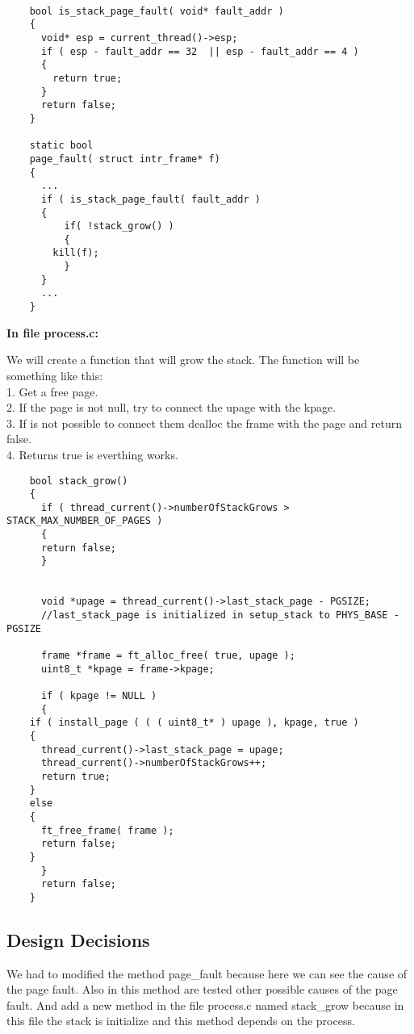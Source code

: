\begin{lstlisting}

	bool is_stack_page_fault( void* fault_addr )
	{
	  void* esp = current_thread()->esp;
	  if ( esp - fault_addr == 32  || esp - fault_addr == 4 )
	  {
	    return true;
	  }
	  return false;
	}

	static bool
	page_fault( struct intr_frame* f)
	{
	  ...
	  if ( is_stack_page_fault( fault_addr )
	  {
	      if( !stack_grow() )
	      {
		kill(f);
	      }
	  }
	  ...
	}

\end{lstlisting}


\textbf{In file process.c: }

We will create a function that will grow the stack. The function will be something like this:
      \\1. Get a free page. 
      \\2. If the page is not null, try to connect the  upage with the kpage.
      \\3. If is not possible to connect them dealloc the frame with the page and return false.
      \\4. Returns true is everthing works.

\begin{lstlisting}
    bool stack_grow()
    {
      if ( thread_current()->numberOfStackGrows > STACK_MAX_NUMBER_OF_PAGES )
      {
	  return false;
      }

      
      void *upage = thread_current()->last_stack_page - PGSIZE; 
      //last_stack_page is initialized in setup_stack to PHYS_BASE - PGSIZE

      frame *frame = ft_alloc_free( true, upage );
      uint8_t *kpage = frame->kpage;
 
      if ( kpage != NULL )
      {
	if ( install_page ( ( ( uint8_t* ) upage ), kpage, true )
	{
	  thread_current()->last_stack_page = upage;
	  thread_current()->numberOfStackGrows++;
	  return true;
	}
	else
	{
	  ft_free_frame( frame );
	  return false;
	}
      }
      return false;
    }

\end{lstlisting}


\subsection{Design Decisions}

We had to modified the method page\_fault because here we can see the cause of the page fault. Also in this method are tested other possible causes of the page fault. And add a new method in the file process.c named stack\_grow because in this file the stack is initialize and this method depends on the process.


